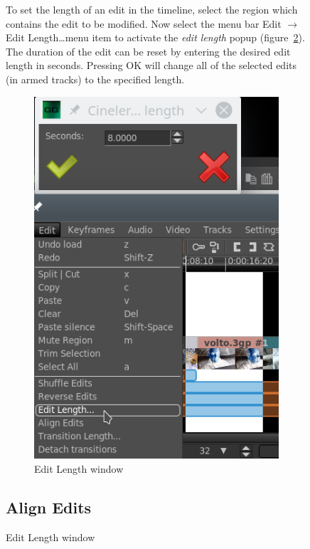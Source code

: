 \begin{figure}
To set the length of an edit in the timeline, select the region which contains the edit to be modified. Now select the menu bar Edit $\rightarrow$ Edit Length\dots menu item to activate the \textit{edit length} popup (figure~\ref{fig:lenght}).  The duration of the edit can be reset by entering the desired edit length in seconds.  Pressing OK will change all of the selected edits (in armed tracks) to the specified length.
\begin{figure}[htpb]
    \centering
    \includegraphics[width=0.6\linewidth]{images/lenght.png}
    \caption{Edit Length window}
    \label{fig:lenght}
\end{figure}

\subsection{Align Edits}%
\label{sub:align_edits}


\end{figure}
